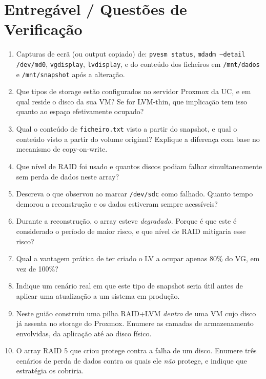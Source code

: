 \documentclass[11pt,a4paper]{article}
\begin{document}
\section{Entregável / Questões de Verificação}
\begin{enumerate}[label=\alph*)]
    \setlength\itemsep{0.2cm}
    \item Capturas de ecrã (ou output copiado) de: \texttt{pvesm status}, \texttt{mdadm --detail /dev/md0}, \texttt{vgdisplay}, \texttt{lvdisplay}, e do conteúdo dos ficheiros em \texttt{/mnt/dados} e \texttt{/mnt/snapshot} após a alteração.
    \item Que tipos de storage estão configurados no servidor Proxmox da UC, e em qual reside o disco da sua VM? Se for LVM-thin, que implicação tem isso quanto ao espaço efetivamente ocupado?
    \item Qual o conteúdo de \texttt{ficheiro.txt} visto a partir do snapshot, e qual o conteúdo visto a partir do volume original? Explique a diferença com base no mecanismo de copy-on-write.
    \item Que nível de RAID foi usado e quantos discos podiam falhar simultaneamente sem perda de dados neste array?
    \item Descreva o que observou ao marcar \texttt{/dev/sdc} como falhado. Quanto tempo demorou a reconstrução e os dados estiveram sempre acessíveis?
    \item Durante a reconstrução, o array esteve \emph{degradado}. Porque é que este é considerado o período de maior risco, e que nível de RAID mitigaria esse risco?
    \item Qual a vantagem prática de ter criado o LV a ocupar apenas 80\% do VG, em vez de 100\%?
    \item Indique um cenário real em que este tipo de snapshot seria útil antes de aplicar uma atualização a um sistema em produção.
    \item Neste guião construiu uma pilha RAID+LVM \emph{dentro} de uma VM cujo disco já assenta no storage do Proxmox. Enumere as camadas de armazenamento envolvidas, da aplicação até ao disco físico.
    \item O array RAID 5 que criou protege contra a falha de um disco. Enumere três cenários de perda de dados contra os quais ele \emph{não} protege, e indique que estratégia os cobriria.
\end{enumerate}
\end{document}
